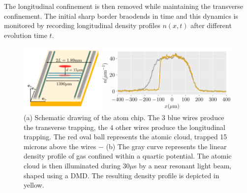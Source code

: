 \documentclass[submission, Phys]{SciPost}
\begin{document}
The longitudinal confinement is then removed while maintaining the transverse confinement. The initial sharp border braodends in time 
and this  dynamics is monitored by recording longitudinal density profiles $n(x,t)$ after different evolution time $t$. %
\begin{figure}[!htb]
    \centering
    \includegraphics[width=1.0\linewidth]{Figures/Atom_chip.PNG}
    \caption{(a) Schematic drawing of the atom chip. The $3$ blue wires produce the transverse trapping, the $4$ other wires produce the longitudinal trapping. The red oval ball represents the atomic cloud, trapped 15 microns above the wires $-$ (b) The gray curve represents the linear density profile of gas confined within a quartic potential. The atomic cloud is then illuminated during $30 \mu$s by a near resonant light beam, shaped using a DMD. The resulting density profile is depicted in yellow.}
    \label{fig:setup}
\end{figure}
\end{document}
